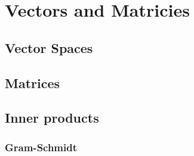 \chapter{Vectors and Matricies}\label{ch:vecmat}
\section{Vector Spaces}

\section{Matrices}

\section{Inner products}
\subsection{Gram-Schmidt}
